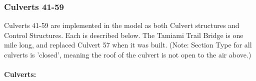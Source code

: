 %
%


\clearpage
\subsubsection{Culverts 41-59}

Culverts 41-59 are implemented in the model as both Culvert structures and Control Structures. Each is described below. The Tamiami Trail Bridge is one mile long, and replaced Culvert 57 when it was built. (Note: Section Type for all culverts is 'closed', meaning the roof of the culvert is not open to the air above.)

\paragraph{Culverts:}

